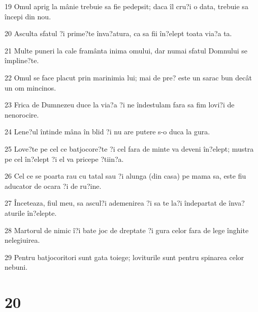 \par 19 Omul aprig la mânie trebuie sa fie pedepsit; daca îl cru?i o data, trebuie sa începi din nou.
\par 20 Asculta sfatul ?i prime?te înva?atura, ca sa fii în?elept toata via?a ta.
\par 21 Multe puneri la cale framânta inima omului, dar numai sfatul Domnului se împline?te.
\par 22 Omul se face placut prin marinimia lui; mai de pre? este un sarac bun decât un om mincinos.
\par 23 Frica de Dumnezeu duce la via?a ?i ne îndestulam fara sa fim lovi?i de nenorocire.
\par 24 Lene?ul întinde mâna în blid ?i nu are putere s-o duca la gura.
\par 25 Love?te pe cel ce batjocore?te ?i cel fara de minte va deveni în?elept; mustra pe cel în?elept ?i el va pricepe ?tiin?a.
\par 26 Cel ce se poarta rau cu tatal sau ?i alunga (din casa) pe mama sa, este fiu aducator de ocara ?i de ru?ine.
\par 27 Înceteaza, fiul meu, sa ascul?i ademenirea ?i sa te la?i îndepartat de înva?aturile în?elepte.
\par 28 Martorul de nimic î?i bate joc de dreptate ?i gura celor fara de lege înghite nelegiuirea.
\par 29 Pentru batjocoritori sunt gata toiege; loviturile sunt pentru spinarea celor nebuni.

\chapter{20}

